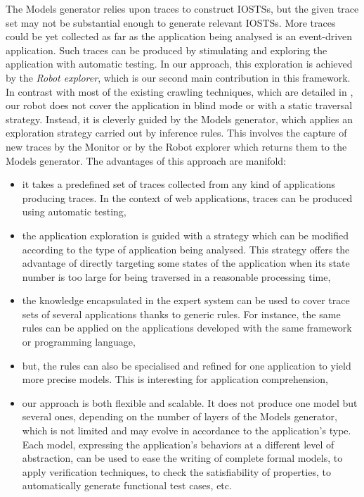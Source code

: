 The Models generator relies upon traces to construct IOSTSs, but
the given trace set may not be substantial enough to generate
relevant IOSTSs. More traces could be yet collected as far as
the application being analysed is an event-driven application.
Such traces can be produced by stimulating and exploring the
application with automatic testing. In our approach, this
exploration is achieved by the \textit{Robot explorer}, which is
our second main contribution in this framework. In contrast with
most of the existing crawling techniques, which are detailed in
, our robot does not
cover the application in blind mode or with a static traversal
strategy.  Instead, it is cleverly guided by the Models
generator, which applies an exploration strategy carried out by
inference rules.  This involves the capture of new traces by the
Monitor or by the Robot explorer which returns them to the Models
generator. The advantages of this approach are manifold:

\begin{itemize}
\item it takes a predefined set of traces collected from any kind
of applications producing traces. In the context of web
applications, traces can be produced using automatic testing,

\item the application exploration is guided with a strategy which
can be modified according to the type of application being
analysed. This strategy offers the advantage of directly targeting
some states of the application when its state number is too large
for being traversed in a reasonable processing time,

\item the knowledge encapsulated in the expert system can be used
to cover trace sets of several applications thanks to generic
rules. For instance, the same rules can be applied on the
applications developed with the same framework or programming
language,

\item but, the rules can also be specialised and refined for one
application to yield more precise models. This is interesting for
application comprehension,

\item our approach is both flexible and scalable. It does not
produce one model but several ones, depending on the number of
layers of the Models generator, which is not limited and may
evolve in accordance to the application's type. Each model,
expressing the application's behaviors at a different level of
abstraction, can be used to ease the writing of complete formal
models, to apply verification techniques, to check the
satisfiability of properties, to automatically generate
functional test cases, etc.
\end{itemize}

